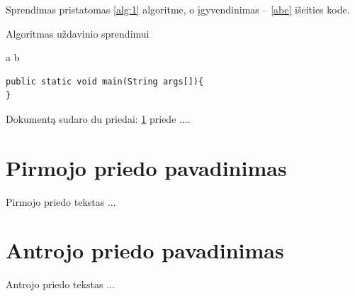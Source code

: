 \documentclass[a4paper,12pt,fleqn]{article}
\begin{document}
Sprendimas pristatomas \ref{alg:1} algoritme, o įgyvendinimas -- \ref{abc} išeities kode.

\begin{algorithm}\caption{Algoritmas uždavinio sprendimui}
  \label{alg:1}
  \begin{algorithmic}
    \REQUIRE
    \ENSURE
    \STATE a \AND b
  \end{algorithmic}


\end{algorithm}



\begin{lstlisting}[caption={Pagrindinio metodo žingsniai},label={abc}]
public static void main(String args[]){
}
\end{lstlisting}








\newpage
\begin{appendices}
  Dokumentą sudaro du priedai: \ref{app:a} priede  ....
  \newpage
  \section{Pirmojo priedo pavadinimas}
  \label{app:a}
  Pirmojo priedo tekstas ...

  \newpage
  \section{Antrojo priedo pavadinimas}
  Antrojo priedo tekstas ...

\end{appendices}
\end{document}
